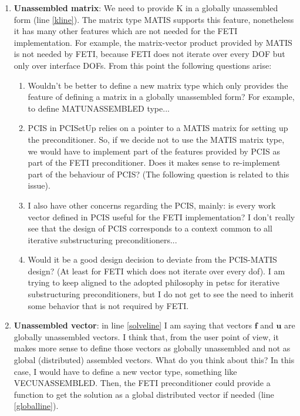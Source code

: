 \documentclass[a4paper,11pt]{report}
\begin{document}
\begin{enumerate}
\item \textbf{Unassembled matrix}: We need to provide K in a globally
  unassembled form (line \ref{kline}). The matrix type MATIS supports
  this feature, nonetheless it has many other features which are not
  needed for the FETI implementation. For example, the
  matrix-vector product provided by MATIS is not needed by FETI,
  because FETI does not iterate
  over every DOF but only over interface DOFs. From this point
  the following questions arise:
  \begin{enumerate}
  \item Wouldn't be better to define a new matrix type which only
    provides the feature of defining a matrix in a globally
    unassembled form? For example, to define MATUNASSEMBLED type...
  \item PCIS in PCISetUp relies on a pointer to a MATIS matrix for
    setting up the preconditioner. So, if we decide not to use the
    MATIS matrix type, we would have to implement part of the features
    provided by PCIS as part of the FETI preconditioner. Does it makes
    sense to re-implement part of the behaviour of PCIS? (The
    following question is related to this issue).
  \item I also have other concerns regarding the PCIS, mainly: is every
    work vector defined in PCIS useful for the FETI
    implementation? I don't really see that the design of PCIS
    corresponds to a context common to all iterative substructuring
    preconditioners...
  \item Would it be a good design decision to deviate from the
    PCIS-MATIS design? (At least for FETI which does not iterate over
    every dof). I am trying to keep aligned to the adopted philosophy
    in petsc for iterative substructuring preconditioners, but I do
    not get to see the need to inherit some behavior that is not
    required by FETI.
  \end{enumerate}

\item \textbf{Unassembled vector}: in line \ref{solveline} I am saying
  that vectors $\bm{f}$ and $\bm{u}$ are globally unassembled
  vectors. I think that, from the user point of view, it makes more
  sense to define those vectors as globally unassembled and not as
  global (distributed) assembled vectors. What do you think about
  this? In this case, I would have to define a new vector type,
  something like VECUNASSEMBLED. Then, the FETI preconditioner could
  provide a function to get the solution as a global distributed
  vector if needed (line \ref{globalline}).
  

\end{enumerate}
\end{document}

